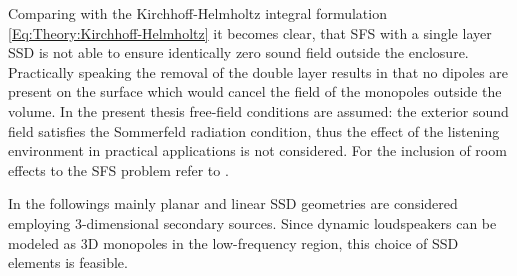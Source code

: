 Comparing with the Kirchhoff-Helmholtz integral formulation \eqref{Eq:Theory:Kirchhoff-Helmholtz} it becomes clear, that SFS with a single layer SSD is not able to ensure identically zero sound field outside the enclosure. Practically speaking the removal of the double layer results in that no dipoles are present on the surface which would cancel the field of the monopoles outside the volume.
In the present thesis free-field conditions are assumed: the exterior sound field satisfies the Sommerfeld radiation condition, thus the effect of the listening environment in practical applications is not considered. For the inclusion of room effects to the SFS problem refer to \cite{Spors2005}.

In the followings mainly planar and linear SSD geometries are considered employing 3-dimensional secondary sources. Since dynamic loudspeakers can be modeled as 3D monopoles in the low-frequency region, this choice of SSD elements is feasible. %


